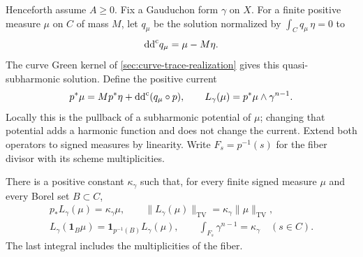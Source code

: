 Henceforth assume $A\geq0$. Fix a Gauduchon form $\gamma$ on $X$. For a finite positive measure
$\mu$ on $C$ of mass $M$, let $q_\mu$ be the solution normalized by
$\int_Cq_\mu\,\eta=0$ to
\[
 \mathrm{dd}^{\mathrm{c}} q_\mu=\mu-M\eta.
\]
The curve Green kernel of \cref{sec:curve-trace-realization}
gives this quasi-subharmonic solution. Define the positive current
\[
 p^*\mu=M p^*\eta+\mathrm{dd}^{\mathrm{c}}(q_\mu\circ p),\qquad
 L_\gamma(\mu)=p^*\mu\wedge\gamma^{n-1}.
\]
Locally this is the pullback of a subharmonic potential of $\mu$;
changing that potential adds a harmonic function and does not
change the current. Extend both operators to signed measures by
linearity. Write $F_s=p^{-1}(s)$ for the fiber divisor with its
scheme multiplicities.

\begin{lemma}\label{fibration:gauduchon-fiber-volume}
There is a positive constant $\kappa_\gamma$ such that, for every
finite signed measure $\mu$ and every Borel set $B\subset C$,
\[
 \begin{gathered}
 p_*L_\gamma(\mu)=\kappa_\gamma\mu,\qquad
 \|L_\gamma(\mu)\|_{\mathrm{TV}}
               =\kappa_\gamma\|\mu\|_{\mathrm{TV}},\\
 L_\gamma(\mathbf1_B\mu)
            =\mathbf1_{p^{-1}(B)}L_\gamma(\mu),\qquad
 \int_{F_s}\gamma^{n-1}=\kappa_\gamma\quad(s\in C).
 \end{gathered}
\]
The last integral includes the multiplicities of the fiber.
\end{lemma}
